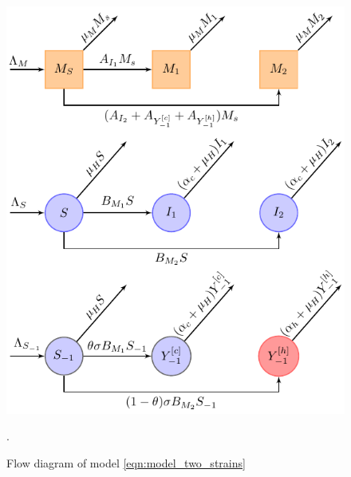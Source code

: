 
\begin{figure}[htb]
	\centering
	\includegraphics[width=\linewidth]{disiase_flow.pdf}
	\caption{Flow diagram of model \eqref{eqn:model_two_strains}}.
	\label{fig:disiaseflow}
\end{figure}
%
